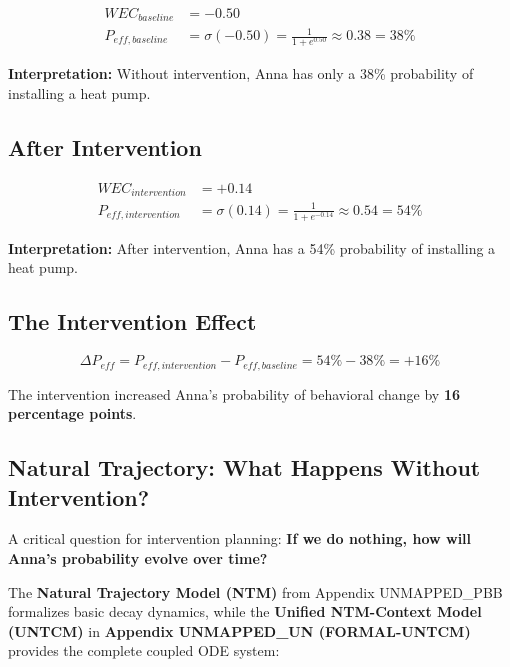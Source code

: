 \begin{align}
WEC_{baseline} &= -0.50 \\
P_{eff,baseline} &= \sigma(-0.50) = \frac{1}{1 + e^{0.50}} \approx 0.38 = 38\%
\end{align}

\textbf{Interpretation:} Without intervention, Anna has only a 38\% probability 
of installing a heat pump.

\subsection{After Intervention}

\begin{align}
WEC_{intervention} &= +0.14 \\
P_{eff,intervention} &= \sigma(0.14) = \frac{1}{1 + e^{-0.14}} \approx 0.54 = 54\%
\end{align}

\textbf{Interpretation:} After intervention, Anna has a 54\% probability 
of installing a heat pump.

\subsection{The Intervention Effect}

\begin{equation}
\Delta P_{eff} = P_{eff,intervention} - P_{eff,baseline} = 54\% - 38\% = +16\%
\end{equation}

The intervention increased Anna's probability of behavioral change by
\textbf{16 percentage points}.

\subsection{Natural Trajectory: What Happens Without Intervention?}
\label{sec:ch16-ntm}

A critical question for intervention planning: \textbf{If we do nothing, how will Anna's probability evolve over time?}

The \textbf{Natural Trajectory Model (NTM)} from Appendix UNMAPPED_PBB formalizes basic decay dynamics, while the \textbf{Unified NTM-Context Model (UNTCM)} in \textbf{Appendix UNMAPPED_UN (FORMAL-UNTCM)} provides the complete coupled ODE system:

